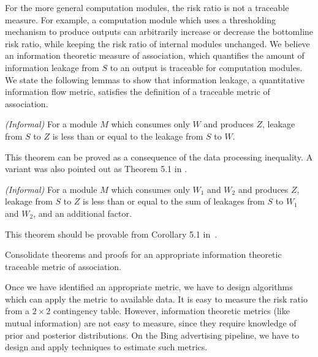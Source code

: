 \documentclass[10pt, onecolumn]{report}
\begin{document}
For the more general computation modules, 
the risk ratio is not a traceable measure. For example, 
a computation module which uses a thresholding mechanism to produce outputs
can arbitrarily increase or decrease the bottomline risk ratio, 
while keeping the risk ratio of internal modules unchanged. 
We believe an information theoretic measure of association, which 
quantifies the amount of information leakage from $S$ to an output is traceable for
computation modules. We state the following lemmas to show that information leakage, 
a quantitative information flow metric, 
satisfies the definition of a traceable metric of association. 

\begin{lemma}\label{lem:seq} \emph{(Informal)}
For a module $M$ which consumes only $W$ and produces $Z$, 
leakage from $S$ to $Z$ is less than or equal to the leakage from $S$ to $W$. 
\end{lemma}
This theorem can be proved as a consequence of the data processing inequality.
A variant was also pointed out as Theorem 5.1 in \cite{smith2015recent}. 

\begin{lemma}\label{lem:parallel} \emph{(Informal)}
For a module $M$ which consumes only $W_1$ and $W_2$ and produces $Z$, 
leakage from $S$ to $Z$ is less than or equal to the sum of leakages from 
$S$ to $W_1$ and $W_2$, and an additional factor. 
\end{lemma}
This theorem should be provable from Corollary 5.1 
in~\cite{kawamoto2014compositionality}.

\begin{task}\label{task:proof}
Consolidate theorems and proofs for an appropriate information theoretic 
traceable metric of association. 
\end{task}

Once we have identified an appropriate metric, we have to design algorithms which can 
apply the metric to available data. It is easy to measure the risk ratio from 
a $2\times 2$ contingency table. However, information theoretic 
metrics (like mutual information) are not
easy to measure, since they require knowledge of prior and posterior distributions. 
On the Bing advertising pipeline, we have to design and apply techniques to estimate
such metrics. 
\end{document}
